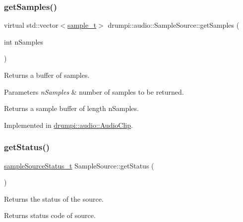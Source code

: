 \subsubsection{\texorpdfstring{get\+Samples()}{getSamples()}}
{\footnotesize\ttfamily virtual std\+::vector$<$\hyperlink{namespacedrumpi_1_1audio_aca0bdc9164f87b72057e284442abab6e}{sample\+\_\+t}$>$ drumpi\+::audio\+::\+Sample\+Source\+::get\+Samples (\begin{DoxyParamCaption}\item[{int}]{n\+Samples }\end{DoxyParamCaption})\hspace{0.3cm}{\ttfamily [pure virtual]}}

Returns a buffer of samples. 
\begin{DoxyParams}{Parameters}
{\em n\+Samples} & number of samples to be returned. \\
\hline
\end{DoxyParams}
\begin{DoxyReturn}{Returns}
a sample buffer of length n\+Samples. 
\end{DoxyReturn}


Implemented in \hyperlink{classdrumpi_1_1audio_1_1AudioClip_aad8e2b4282047c0fb884d4f93210c83b}{drumpi\+::audio\+::\+Audio\+Clip}.

\mbox{\label{classdrumpi_1_1audio_1_1SampleSource_a9fea9c824e15d891cbacbf4c5187c2aa}} 
\subsubsection{\texorpdfstring{get\+Status()}{getStatus()}}
{\footnotesize\ttfamily \hyperlink{namespacedrumpi_1_1audio_a51bdf5757f414341f104d45e75e2bf63}{sample\+Source\+Status\+\_\+t} Sample\+Source\+::get\+Status (\begin{DoxyParamCaption}{ }\end{DoxyParamCaption})}

Returns the status of the source. \begin{DoxyReturn}{Returns}
status code of source. 
\end{DoxyReturn}
\mbox{\label{classdrumpi_1_1audio_1_1SampleSource_a83b000d9fe8335788f4ba876b13b4b66}} 

